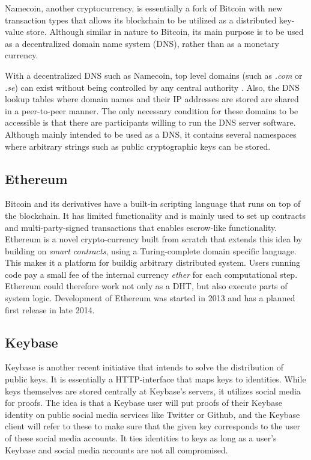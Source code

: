 Namecoin\cite{CryptoCoinInsider:2014:Online}, another cryptocurrency, is essentially a fork of Bitcoin with new transaction types that allows its blockchain to be utilized as a distributed key-value store. Although similar in nature to Bitcoin, its main purpose is to be used as a decentralized domain name system (DNS), rather than as a monetary currency.

With a decentralized DNS such as Namecoin, top level domains (such as \emph{.com} or \emph{.se}) can exist without being controlled by any central authority \cite{CryptoCoinInsider:2014:Online}. Also, the DNS lookup tables where domain names and their IP addresses are stored are shared in a peer-to-peer manner. The only necessary condition for these domains to be accessible is that there are participants willing to run the DNS server software. Although mainly intended to be used as a DNS, it contains several namespaces where arbitrary strings such as public cryptographic keys can be stored.

\subsection{Ethereum}
Bitcoin and its derivatives have a built-in scripting language that runs on top of the blockchain. It has limited functionality and is mainly used to set up contracts and multi-party-signed transactions that enables escrow-like functionality. Ethereum\cite{Ethereum:Online} is a novel crypto-currency built from scratch that extends this idea by building on \emph{smart contracts}, using a Turing-complete domain specific language. This makes it a platform for buildig arbitrary distributed system. Users running code pay a small fee of the internal currency \emph{ether} for each computational step. Ethereum could therefore work not only as a DHT, but also execute parts of system logic. Development of Ethereum was started in 2013 and has a planned first release in late 2014.

\subsection{Keybase}
Keybase \cite{Keybase:Online} is another recent initiative that intends to solve the distribution of public keys. It is essentially a HTTP-interface that maps keys to identities. While keys themselves are stored centrally at Keybase's servers, it utilizes social media for proofs. The idea is that a Keybase user will put proofs of their Keybase identity on public social media services like Twitter or Github, and the Keybase client will refer to these to make sure that the given key corresponds to the user of these social media accounts. It ties identities to keys as long as a user's Keybase and social media accounts are not all compromised.

